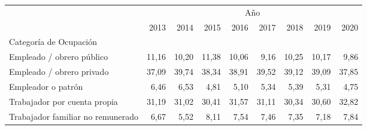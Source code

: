 \begin{tabular}{lllllllll}
\cline{1-9}
\multicolumn{1}{c}{} &
  \multicolumn{8}{|c}{Año} \\
\multicolumn{1}{c}{} &
  \multicolumn{1}{|r}{2013} &
  \multicolumn{1}{r}{2014} &
  \multicolumn{1}{r}{2015} &
  \multicolumn{1}{r}{2016} &
  \multicolumn{1}{r}{2017} &
  \multicolumn{1}{r}{2018} &
  \multicolumn{1}{r}{2019} &
  \multicolumn{1}{r}{2020} \\
\cline{1-9}
\multicolumn{1}{l}{Categoría de Ocupación} &
  \multicolumn{1}{|r}{} &
  \multicolumn{1}{r}{} &
  \multicolumn{1}{r}{} &
  \multicolumn{1}{r}{} &
  \multicolumn{1}{r}{} &
  \multicolumn{1}{r}{} &
  \multicolumn{1}{r}{} &
  \multicolumn{1}{r}{} \\
\multicolumn{1}{l}{\hspace{1em}Empleado / obrero público} &
  \multicolumn{1}{|r}{11,16} &
  \multicolumn{1}{r}{10,20} &
  \multicolumn{1}{r}{11,38} &
  \multicolumn{1}{r}{10,06} &
  \multicolumn{1}{r}{9,16} &
  \multicolumn{1}{r}{10,25} &
  \multicolumn{1}{r}{10,17} &
  \multicolumn{1}{r}{9,86} \\
\multicolumn{1}{l}{\hspace{1em}Empleado / obrero privado} &
  \multicolumn{1}{|r}{37,09} &
  \multicolumn{1}{r}{39,74} &
  \multicolumn{1}{r}{38,34} &
  \multicolumn{1}{r}{38,91} &
  \multicolumn{1}{r}{39,52} &
  \multicolumn{1}{r}{39,12} &
  \multicolumn{1}{r}{39,09} &
  \multicolumn{1}{r}{37,85} \\
\multicolumn{1}{l}{\hspace{1em}Empleador o patrón} &
  \multicolumn{1}{|r}{6,46} &
  \multicolumn{1}{r}{6,53} &
  \multicolumn{1}{r}{4,81} &
  \multicolumn{1}{r}{5,10} &
  \multicolumn{1}{r}{5,34} &
  \multicolumn{1}{r}{5,39} &
  \multicolumn{1}{r}{5,31} &
  \multicolumn{1}{r}{4,75} \\
\multicolumn{1}{l}{\hspace{1em}Trabajador por cuenta propia} &
  \multicolumn{1}{|r}{31,19} &
  \multicolumn{1}{r}{31,02} &
  \multicolumn{1}{r}{30,41} &
  \multicolumn{1}{r}{31,57} &
  \multicolumn{1}{r}{31,11} &
  \multicolumn{1}{r}{30,34} &
  \multicolumn{1}{r}{30,60} &
  \multicolumn{1}{r}{32,82} \\
\multicolumn{1}{l}{\hspace{1em}Trabajador familiar no remunerado} &
  \multicolumn{1}{|r}{6,67} &
  \multicolumn{1}{r}{5,52} &
  \multicolumn{1}{r}{8,11} &
  \multicolumn{1}{r}{7,54} &
  \multicolumn{1}{r}{7,46} &
  \multicolumn{1}{r}{7,35} &
  \multicolumn{1}{r}{7,18} &
  \multicolumn{1}{r}{7,84} \\

\end{tabular}
